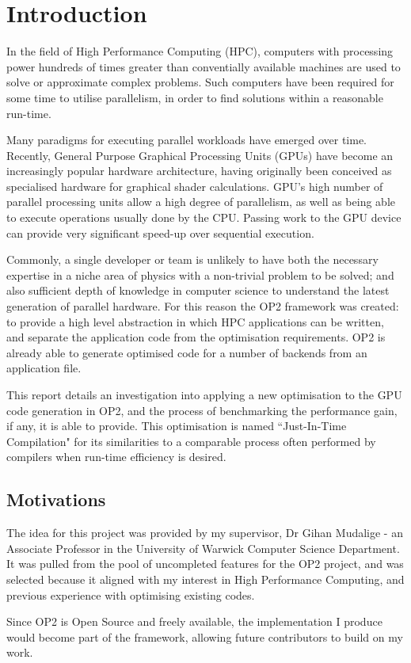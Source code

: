 
\section{Introduction}

In the field of High Performance Computing (HPC), computers with processing power hundreds of times greater than conventially available machines are used to solve or approximate complex problems. Such computers have been required for some time to utilise parallelism, in order to find solutions within a reasonable run-time.
\par Many paradigms for executing parallel workloads have emerged over time. Recently, General Purpose Graphical Processing Units (GPUs) have become an increasingly popular hardware architecture, having originally been conceived as specialised hardware for graphical shader calculations. GPU's high number of parallel processing units allow a high degree of parallelism, as well as being able to execute operations usually done by the CPU. Passing work to the GPU device can provide very significant speed-up over sequential execution.
\par
Commonly, a single developer or team is unlikely to have both the necessary expertise in a niche area of physics with a non-trivial problem to be solved; and also sufficient depth of knowledge in computer science to understand the latest generation of parallel hardware. For this reason the OP2 framework was created: to provide a high level abstraction in which HPC applications can be written, and separate the application code from the optimisation requirements. OP2 is already able to generate optimised code for a number of backends from an application file.
\par
This report details an investigation into applying a new optimisation to the GPU code generation in OP2, and the process of benchmarking the performance gain, if any, it is able to provide.
This optimisation is named ``Just-In-Time Compilation" for its similarities to a comparable process often performed by compilers when run-time efficiency is desired.
\vfill
\subsection{Motivations}
The idea for this project was provided by my supervisor, Dr Gihan Mudalige - an Associate Professor in the University of Warwick Computer Science Department. It was pulled from the pool of uncompleted features for the OP2 project, and was selected because it aligned with my interest in High Performance Computing, and previous experience with optimising existing codes.
\par
Since OP2 is Open Source and freely available, the implementation I produce would become part of the framework, allowing future contributors to build on my work.

